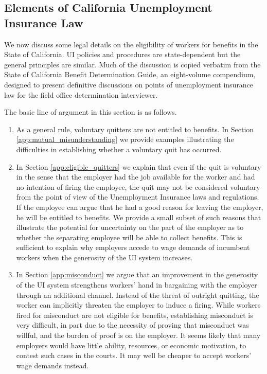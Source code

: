 \documentclass[12pt]{article}
\newcommand{\1}{\mathbf{1}}
\begin{document}
\begin{appendix}
\subsection{Elements of California Unemployment Insurance Law}
\label{sec:law}

We now discuss some legal details on the eligibility of workers for benefits in the State of California. UI policies and procedures are state-dependent but the general principles are similar. Much of the discussion is copied verbatim from the State of California Benefit Determination Guide, an eight-volume compendium, designed to present definitive discussions on points of unemployment insurance law for the field office determination interviewer.

The basic line of argument in this section is as follows.
\begin{enumerate}
\item As a general rule, voluntary quitters are not entitled to benefits. In Section \ref{app:mutual_misunderstanding} we provide examples illustrating the difficulties in establishing whether a voluntary quit has occurred.

\item In Section \ref{app:eligible_quitters} we explain that even if the quit is voluntary in the sense that the employer had the job available for the worker and had no intention of firing the employee, the quit may not be considered voluntary from the point of view of the Unemployment Insurance laws and regulations. If the employee can argue that he had a good reason for leaving the employer, he will be entitled to benefits. We provide a small subset of such reasons that illustrate the potential for uncertainty on the part of the employer as to whether the separating employee will be able to collect benefits. This is sufficient to explain why employers accede to wage demands of incumbent workers when the generosity of the UI system increases.

\item In Section \ref{app:misconduct} we argue that an improvement in the generosity of the UI system strengthens workers' hand in bargaining with the employer through an additional channel. Instead of the threat of outright quitting, the worker can implicitly threaten the employer to induce a firing. While workers fired for misconduct are not eligible for benefits, establishing misconduct is very difficult, in part due to the necessity of proving that misconduct was willful, and  the burden of proof is on the employer. It seems likely that many employers would have little ability, resources, or economic motivation, to contest such cases in the courts. It may well be cheaper to accept workers' wage demands instead.


\end{enumerate}
\end{appendix}
\end{document}
